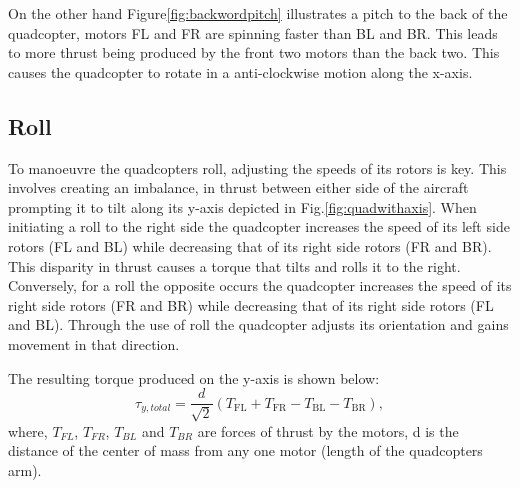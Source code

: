 \documentclass{report}
\begin{document}
On the other hand Figure\ref{fig:backwordpitch} illustrates a pitch to the back
of the quadcopter, motors FL and FR are spinning faster than BL and BR. This
leads to more thrust being produced by the front two motors than the back two.
This causes the quadcopter to rotate in a anti-clockwise motion along the
x-axis.

\subsection{Roll}
To manoeuvre the quadcopters roll, adjusting the speeds of its rotors is key.
This involves creating an imbalance, in thrust between either side of the
aircraft prompting it to tilt along its  y-axis depicted in
Fig.\ref{fig:quadwithaxis}. When initiating a roll to the right side the
quadcopter increases the speed of its left side rotors (FL and BL) while
decreasing that of its right side rotors (FR and BR). This disparity in thrust
causes a torque that tilts and rolls it to the right. Conversely, for a roll the
opposite occurs the quadcopter increases the speed of its right side rotors (FR
and BR) while decreasing that of its right side rotors (FL and BL). Through the
use of roll the quadcopter adjusts its orientation and gains movement in that
direction. 

The resulting torque produced on the y-axis is shown below:
\begin{equation}
  \tau_{y, total} = \frac{d}{\sqrt{2}} (T_{\text{FL}} + T_{\text{FR}} - T_{\text{BL}} - T_{\text{BR}}),
  \label{torque_y}
\end{equation}
where, \(T_{FL}\),  \(T_{FR}\), \(T_{BL}\) and \(T_{BR}\) are forces of thrust
by the motors, d is the distance of the center of mass from any one motor
(length of the quadcopters arm).
\end{document}

